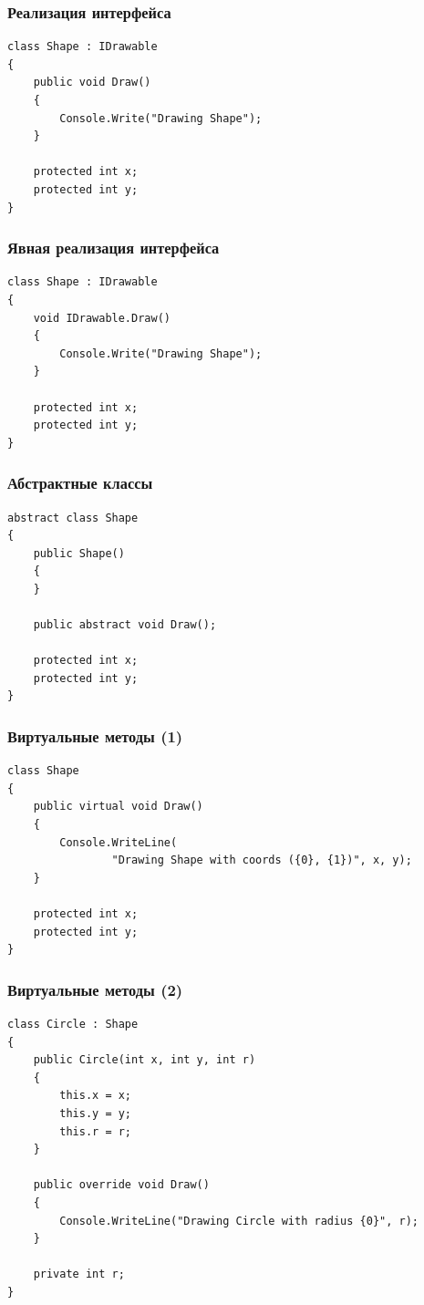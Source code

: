 \documentclass[xetex,mathserif,serif]{beamer}
\begin{document}
	\begin{frame}[fragile]
		\frametitle{Реализация интерфейса}
		\begin{verbatim}
class Shape : IDrawable
{
    public void Draw()
    {
        Console.Write("Drawing Shape");
    }

    protected int x;
    protected int y;
}
		\end{verbatim}
\end{frame}

	\begin{frame}[fragile]
		\frametitle{Явная реализация интерфейса}
		\begin{verbatim}
class Shape : IDrawable
{
    void IDrawable.Draw()
    {
        Console.Write("Drawing Shape");
    }

    protected int x;
    protected int y;
}
		\end{verbatim}
\end{frame}

	\begin{frame}[fragile]
		\frametitle{Абстрактные классы}
		\begin{verbatim}
abstract class Shape
{
    public Shape() 
    {
    }

    public abstract void Draw();

    protected int x;
    protected int y;
}
		\end{verbatim}
\end{frame}

	\begin{frame}[fragile]
		\frametitle{Виртуальные методы (1)}
		\begin{verbatim}
class Shape
{
    public virtual void Draw()
    {
        Console.WriteLine(
                "Drawing Shape with coords ({0}, {1})", x, y);
    }

    protected int x;
    protected int y;
}
		\end{verbatim}
\end{frame}

	\begin{frame}[fragile]
		\frametitle{Виртуальные методы (2)}
		\begin{verbatim}
class Circle : Shape
{
    public Circle(int x, int y, int r)
    {
        this.x = x;
        this.y = y;
        this.r = r;
    }

    public override void Draw()
    {
        Console.WriteLine("Drawing Circle with radius {0}", r);
    }

    private int r;
}
		\end{verbatim}
\end{frame}
\end{document}
